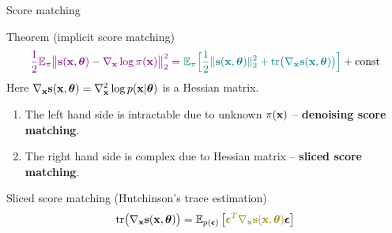 \begin{frame}{Score matching}
	\vspace{-0.3cm}
	\begin{block}{Theorem (implicit score matching)}
		\vspace{-0.6cm}
		\[
		{\color{violet}\frac{1}{2} \mathbb{E}_{\pi}\bigl\| \mathbf{s}(\mathbf{x}, \boldsymbol{\theta}) - \nabla_{\mathbf{x}} \log \pi(\mathbf{x}) \bigr\|^2_2} = {\color{teal}\mathbb{E}_{\pi}\Bigr[ \frac{1}{2}\| \mathbf{s}(\mathbf{x}, \boldsymbol{\theta}) \|_2^2 + \text{tr}\bigl(\nabla_{\mathbf{x}} \mathbf{s}(\mathbf{x}, \boldsymbol{\theta})\bigr) \Bigr]} + \text{const}
		\]
		Here $\nabla_{\mathbf{x}} \mathbf{s}(\mathbf{x}, \boldsymbol{\theta}) = \nabla_{\mathbf{x}}^2 \log p(\mathbf{x} | \boldsymbol{\theta})$ is a Hessian matrix.
	\end{block}
	\begin{enumerate}
		\item {\color{violet}The left hand side} is intractable due to unknown $\pi(\mathbf{x})$ -- \textbf{denoising score matching}. 
		\item {\color{teal}The right hand side} is complex due to Hessian matrix -- \textbf{sliced score matching}.
	\end{enumerate}
	\begin{block}{Sliced score matching (Hutchinson's trace estimation)}
	\vspace{-0.3cm}
	\[
		\text{tr}\bigl(\nabla_{\bx} \bs(\bx, \btheta)\bigr) = \mathbb{E}_{p(\bepsilon)} \left[ {\color{olive}\bepsilon^T \nabla_{\bx} \bs(\bx, \btheta)} \bepsilon \right]
	\]
	\end{block}
\end{frame}
